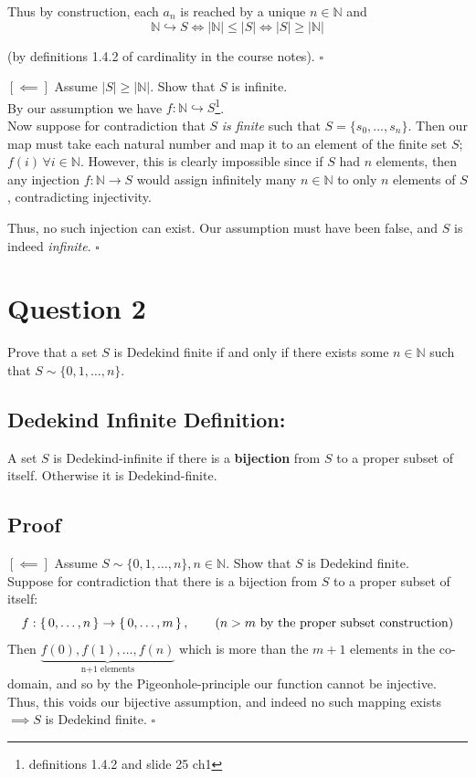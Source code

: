 \documentclass[dvipsnames,12pt]{exam}
\newcommand{\N}{{\mathbb{N}}}
\begin{document}
Thus by construction, each $a_n$ is reached by a unique $n \in \N$ and $$\N \hookrightarrow S \iff |\N| \leq |S| \iff |S| \geq |\N|$$

(by definitions 1.4.2 of cardinality in the course notes). $\square$

\bigskip

$[\impliedby]$ Assume $|S| \geq |\N|$. Show that $S$ is infinite.\\

By our assumption we have $f: \N \hookrightarrow S$\footnote{definitions 1.4.2 and slide 25 ch1}.\\

Now suppose for contradiction that $S$ \emph{is finite} such that $S = \{s_0, ...,s_n\}$. Then our map must take each natural number and map it to an element of the finite set $S$; $f(i)\, \forall i \in \N$. However, this is clearly impossible since if $S$ had $n$ elements, then any injection $f: \N \to S$ would assign infinitely many $n \in \N$ to only $n$ elements of $S$, contradicting injectivity. 

Thus, no such injection can exist. Our assumption must have been false, and $S$ is indeed \emph{infinite}. $\square$

\newpage
\section{Question 2}
Prove that a set $S$ is Dedekind finite if and only if there exists some $n \in \N$ such that $S \sim \{0,1,\ldots,n\}$.

\subsection{Dedekind Infinite Definition:}
A set $S$ is Dedekind-infinite if there is a \textbf{bijection} from $S$ to a proper subset of itself. Otherwise it is Dedekind-finite.

\subsection{Proof}
$[\impliedby]$ Assume $S \sim \{0,1,\ldots,n\}, n\in\N$. Show that $S$ is Dedekind finite.\\

Suppose for contradiction that there is a bijection from $S$ to a proper subset of itself:
\begin{equation}
    f: \set{0,\ldots, n} \to \set{0,\ldots,m}, \qquad(n > m \text{ by the proper subset construction})
\end{equation}
Then $\underbrace{f(0),f(1),\ldots,f(n)}_{\text{n+1 elements}}$ which is more than the $m+1$ elements in the co-domain, and so by the Pigeonhole-principle our function cannot be injective. Thus, this voids our bijective assumption, and indeed no such mapping exists $\implies S$  is Dedekind finite. $\square$
\end{document}

